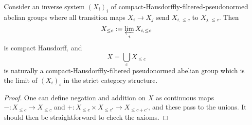 \begin{proposition}
  \label{bounded-limits}
  \leanok
  Consider an inverse system $(X_i)_i$ of compact-Hausdorffly-filtered-pseudonormed abelian groups
  where all transition maps $X_i\to X_j$ send $X_{i,\leq c}$ to $X_{j,\leq c}$.
  Then
  \[ X_{\leq c} := \varprojlim_i X_{i,\leq c} \]
  is compact Hausdorff, and
  \[ X=\bigcup_c X_{\leq c} \]
  is naturally a compact-Hausdorffly-filtered pseudonormed abelian group
  which is the limit of $(X_i)_i$ in the strict category structure.
\end{proposition}

\begin{proof}
  \leanok
  One can define negation and addition on $X$ as continuous maps
  $-: X_{\leq c}\to X_{\leq c}$ and $+: X_{\leq c}\times X_{\leq c'}\to X_{\leq c+c'}$, and these pass to the unions.
  It should then be straightforward to check the axioms.
\end{proof}

